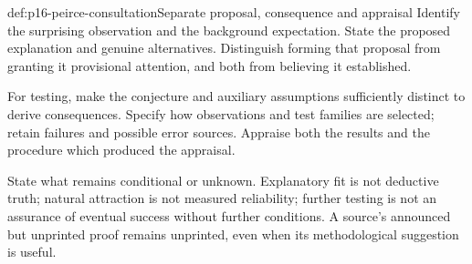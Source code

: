 \begin{hbmethod}{def:p16-peirce-consultation}{Separate proposal, consequence and appraisal}
Identify the surprising observation and the background expectation.
State the proposed explanation and genuine alternatives. Distinguish
forming that proposal from granting it provisional attention, and both
from believing it established.

For testing, make the conjecture and auxiliary assumptions sufficiently
distinct to derive consequences. Specify how observations and test
families are selected; retain failures and possible error sources.
Appraise both the results and the procedure which produced the appraisal.

State what remains conditional or unknown. Explanatory fit is not
deductive truth; natural attraction is not measured reliability;
further testing is not an assurance of eventual success without further
conditions. A source's announced but unprinted proof remains unprinted,
even when its methodological suggestion is useful.
\end{hbmethod}

